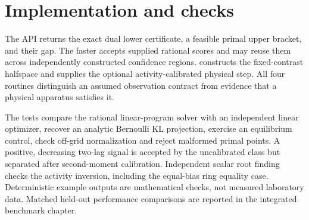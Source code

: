 \section{Implementation and checks}
The API  returns the
exact dual lower certificate, a feasible primal upper bracket, and their gap.
The faster  accepts supplied rational scores and may reuse them
across independently constructed confidence regions.
 constructs the fixed-contrast halfspace and
 supplies the optional activity-calibrated physical step.
All four routines distinguish an assumed observation contract from evidence
that a physical apparatus satisfies it.

The tests compare the rational linear-program solver with an independent
linear optimizer, recover an analytic Bernoulli KL projection, exercise an
equilibrium control, check off-grid normalization and reject malformed primal
points. A positive, decreasing two-lag signal is accepted by the uncalibrated
class but separated after second-moment calibration. Independent scalar root
finding checks the activity inversion, including the equal-bias ring equality
case. Deterministic example outputs are mathematical checks, not measured
laboratory data. Matched held-out performance comparisons are reported in the
integrated benchmark chapter.
